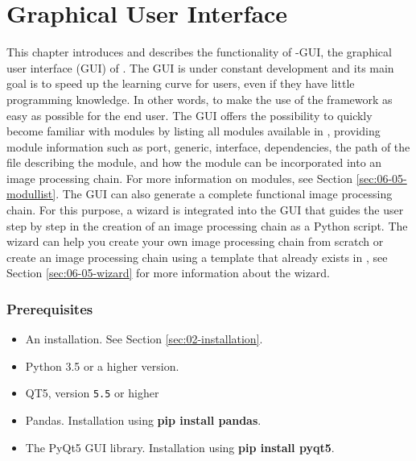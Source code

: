
	
\section{Graphical User Interface}\label{ch:06-05-tools-gui}



This chapter introduces and describes the functionality of \asterics-GUI, the graphical user interface (GUI) of \asterics. The GUI is under constant development and its main goal is to speed up the learning curve for \asterics users, even if they have little programming knowledge. In other words, to make the use of the \asterics framework as easy as possible for the end user. The GUI offers the possibility to quickly become familiar with \asterics modules by listing all modules available in \asterics, providing module information such as port, generic, interface, dependencies, the path of the file describing the module, and how the module can be incorporated into an image processing chain. For more information on \asterics modules, see Section \ref{sec:06-05-modullist}. The GUI can also generate a complete functional image processing chain. For this purpose, a wizard is integrated into the GUI that guides the user step by step in the creation of an image processing chain as a Python script. The wizard can help you create your own image processing chain from scratch or create an image processing chain using a template that already exists in \asterics, see Section \ref{sec:06-05-wizard} for more information about the wizard.
	
	\subsubsection*{Prerequisites}
	\begin{itemize}
		\item An \asterics installation. See Section \ref{sec:02-installation}.
		\item Python 3.5 or a higher version.
		\item QT5, version \texttt{5.5} or higher
		\item Pandas. Installation using \textbf{pip install pandas}.
		\item The PyQt5 GUI library. Installation using \textbf{pip install pyqt5}.
	\end{itemize}

